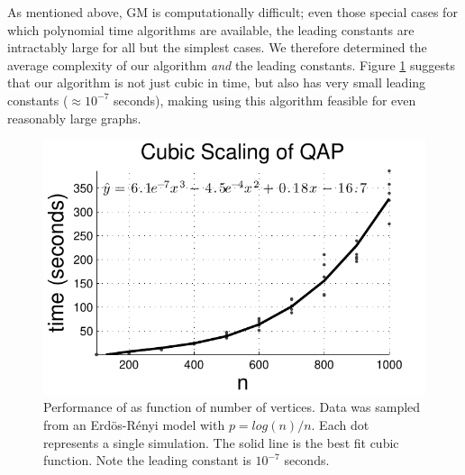 \documentclass[10pt,journal,cspaper,compsoc]{IEEEtran}
\begin{document}
As mentioned above, GM is computationally difficult; even those special cases for which polynomial time algorithms are available, the leading constants are intractably large for all but the simplest cases. We therefore determined the average complexity of our algorithm \emph{and} the leading constants.  Figure \ref{fig:scaling} suggests that our algorithm is not just cubic in time, but also has very small leading constants ($\approx 10^{-7}$ seconds), making using this algorithm feasible for even reasonably large graphs.




\begin{figure}[htbp]
	\centering			
	\includegraphics[width=1.0\linewidth]{../figs/digraph_qap2}
	\caption{Performance of \rqap as function of number of vertices. Data was sampled from an Erd\"os-R\'enyi model with $p=log(n)/n$.  Each dot represents a single simulation.  The solid line is the best fit cubic function.  Note the leading constant is $10^{-7}$ seconds. }
	\label{fig:scaling}
\end{figure}
\end{document}

